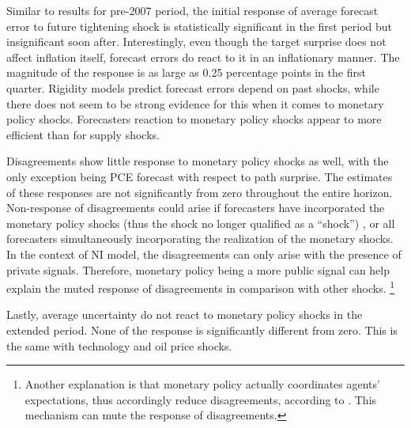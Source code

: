 \documentclass[]{article}
\begin{document}
	Similar to results for pre-2007 period, the initial response of average forecast error to future tightening shock is statistically significant in the first period but insignificant soon after.  Interestingly, even though the target surprise does not affect inflation itself, forecast errors do react to it in an inflationary manner. The magnitude of the response is as large as 0.25 percentage points in the first quarter. Rigidity models predict forecast errors depend on past shocks, while there does not seem to be strong evidence for this when it comes to monetary policy shocks. Forecasters reaction to monetary policy shocks appear to more efficient than for supply shocks. 
	
	Disagreements show little response to monetary policy shocks as well, with the only exception being PCE forecast with respect to path surprise. The estimates of these responses are not  significantly from zero throughout the entire horizon. Non-response of disagreements could arise if forecasters have incorporated the monetary policy shocks (thus the shock no longer qualified as a ``shock'') , or all forecasters simultaneously incorporating the realization of the monetary shocks. In the context of NI model, the disagreements can only arise with the presence of private signals. Therefore, monetary policy being a more public signal can help explain the muted response of disagreements in comparison with other shocks. \footnote{Another explanation is that monetary policy actually coordinates agents' expectations, thus accordingly reduce disagreements, according to \citet{morris2002social}. This mechanism can mute the response of disagreements.}
	
	Lastly, average uncertainty do not react to monetary policy shocks in the extended period. None of the response is significantly different from zero. This is the same with technology and oil price shocks. 
	
\end{document}
